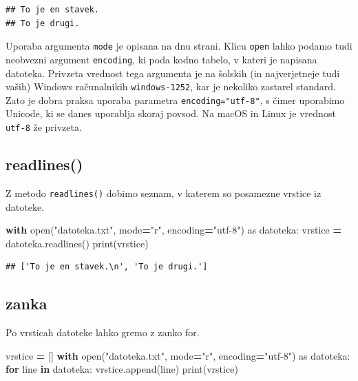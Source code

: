 \documentclass[
]{book}
\newenvironment{Shaded}{\begin{snugshade}}{\end{snugshade}}
\newcommand{\BuiltInTok}[1]{#1}
\newcommand{\ControlFlowTok}[1]{\textcolor[rgb]{0.13,0.29,0.53}{\textbf{#1}}}
\newcommand{\ImportTok}[1]{#1}
\newcommand{\KeywordTok}[1]{\textcolor[rgb]{0.13,0.29,0.53}{\textbf{#1}}}
\newcommand{\NormalTok}[1]{#1}
\newcommand{\OperatorTok}[1]{\textcolor[rgb]{0.81,0.36,0.00}{\textbf{#1}}}
\newcommand{\StringTok}[1]{\textcolor[rgb]{0.31,0.60,0.02}{#1}}
\begin{document}
\begin{verbatim}
## To je en stavek.
## To je drugi.
\end{verbatim}

Uporaba argumenta \texttt{mode} je opisana na dnu strani.
Klicu \texttt{open} lahko podamo tudi neobvezni argument \texttt{encoding}, ki poda kodno
tabelo, v kateri je napisana datoteka. Privzeta vrednost tega argumenta je na
šolskih (in najverjetneje tudi vaših) Windows računalnikih \texttt{windows-1252}, kar je
nekoliko zastarel standard. Zato je dobra praksa uporaba parametra
\texttt{encoding="utf-8"}, s čimer uporabimo Unicode, ki se danes
uporablja skoraj povsod. Na macOS in Linux je vrednost \texttt{utf-8} že privzeta.

\hypertarget{readlines}{%
\subsection{readlines()}\label{readlines}}

Z metodo \texttt{readlines()} dobimo seznam, v katerem so posamezne
vrstice iz datoteke.

\begin{Shaded}
\begin{Highlighting}[]
\ControlFlowTok{with} \BuiltInTok{open}\NormalTok{(}\StringTok{"datoteka.txt"}\NormalTok{, mode}\OperatorTok{=}\StringTok{"r"}\NormalTok{, encoding}\OperatorTok{=}\StringTok{"utf{-}8"}\NormalTok{) }\ImportTok{as}\NormalTok{ datoteka:}
\NormalTok{    vrstice }\OperatorTok{=}\NormalTok{ datoteka.readlines()}
\BuiltInTok{print}\NormalTok{(vrstice)}
\end{Highlighting}
\end{Shaded}

\begin{verbatim}
## ['To je en stavek.\n', 'To je drugi.']
\end{verbatim}

\hypertarget{zanka}{%
\subsection{zanka}\label{zanka}}

Po vrsticah datoteke lahko gremo z zanko for.

\begin{Shaded}
\begin{Highlighting}[]
\NormalTok{vrstice }\OperatorTok{=}\NormalTok{ []}
\ControlFlowTok{with} \BuiltInTok{open}\NormalTok{(}\StringTok{"datoteka.txt"}\NormalTok{, mode}\OperatorTok{=}\StringTok{"r"}\NormalTok{, encoding}\OperatorTok{=}\StringTok{"utf{-}8"}\NormalTok{) }\ImportTok{as}\NormalTok{ datoteka:}
    \ControlFlowTok{for}\NormalTok{ line }\KeywordTok{in}\NormalTok{ datoteka:}
\NormalTok{        vrstice.append(line)}
\BuiltInTok{print}\NormalTok{(vrstice)}
\end{Highlighting}
\end{Shaded}
\end{document}
